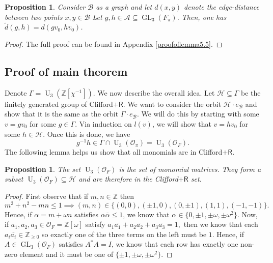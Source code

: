 \documentclass{eptcs}
\newtheorem{proposition}[theorem]{Proposition}
\theoremstyle{remark}
\newtheorem{remark}[theorem]{Remark}
\theoremstyle{definition}
\DeclareMathOperator{\GL}{GL}
\DeclareMathOperator{\U}{U}
\begin{document}
\begin{proposition}
\label{prop:distance}
    Consider $\mathcal{B}$ as a graph and let $d(x,y)$ denote the edge-distance between two points $x,y \in \mathcal{B}$  
    Let $g,h \in \mathcal{A} \subseteq \GL_{3}(F_{\pi})$. 
    Then, one has $\tilde{d}(g,h) = d(g v_{0},hv_{0})$.
\end{proposition}
\begin{proof}
The full proof can be found in Appendix \ref{proofoflemma5.5}.
\end{proof}



\subsection{Proof of main theorem}
\label{ss:proof}
Denote $\Gamma = \U_{3}(\mathbb{Z}[\chi^{-1}])$.
We now describe the overall idea. Let $\mathcal{H} \subseteq \Gamma$ be the finitely generated group of Clifford$+\mathsf{R}$. 
We want to consider the orbit $\mathcal{H} \cdot e_{\mathcal{B}}$ and show that it is the same as the orbit $\Gamma \cdot e_{\mathcal{B}}$. 
We will do this by starting with some $v = g v_{0} $  for some $g \in \Gamma$.  
Via induction on $l(v)$, we will show that $v = h v_{0}$ for some $h \in \mathcal{H}$. Once this is done, we have 
\begin{equation}
    g^{-1}h  \in  \Gamma \cap \U_{3}(\mathcal{O}_{\pi}) = \U_{3}(\mathcal{O}_{F}).
\end{equation}
The following lemma helps us show that all monomials are in Clifford$+\mathsf{R}$.

\begin{proposition}
The set $\U_{3}(\mathcal{O}_{F})$ is the set of monomial matrices. They form a subset $\U_{3}(\mathcal{O}_{F}) \subseteq \mathcal{H}$ and are therefore in the Clifford$+\mathsf{R}$ set.
\end{proposition}
\begin{proof}
    First observe that if $m,n \in \mathbb{Z}$ then
    \begin{equation}
	m^{2} + n^{2} -mn \leq 1  \implies   (m,n) \in \{ (0,0), (\pm 1,0),(0, \pm1), (1, 1), (-1,-1)\}.
    \end{equation}
Hence, if $\alpha = m + \omega n $ satisfies $\alpha \overline{\alpha} \leq 1$, we know that $\alpha \in \{0, \pm 1, \pm \omega, \pm  \omega^{2 }\}$.
    Now, if $a_{1} , a_{2} ,a_{3} \in \mathcal{O}_{F} = \mathbb{Z}[\omega]$ satisfy    
	$a_1\overline{a_{1}} + a_{2} \overline{a_{2}} + a_{3} \overline{a_{3}} = 1,$   
    then we know that each $a_{i} \overline{a_{i}} \in \mathbb{Z}_{\geq 0}$ so exactly one of the three terms on the left must be $1$. 
    Hence, if $A \in \GL_{3} (\mathcal{O}_{F})$ satisfies $A^{*} A = I$, we know that each row has exactly one non-zero element and it must be one of $\{\pm 1, \pm \omega, \pm \omega^{2} \}$.
\end{proof}
\end{document}
